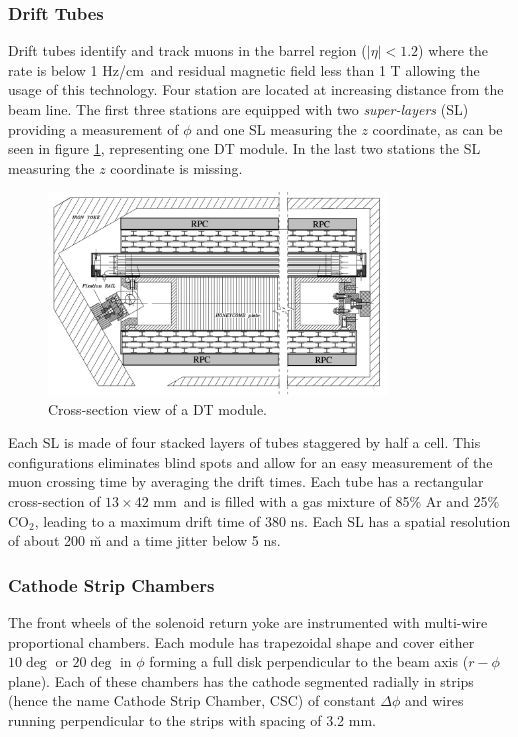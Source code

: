 \subsubsection*{Drift Tubes}

Drift tubes identify and track muons in the barrel region ($|\eta| < 1.2$) where the rate is below 1 Hz/cm\sq ~and residual magnetic field less than 1 T allowing the usage of this technology. Four station are located at increasing distance from the beam line. The first three stations are equipped with two \emph{super-layers} (SL) providing a measurement of $\phi$ and one SL measuring the $z$ coordinate, as can be seen in figure \ref{fig:dt_module}, representing one DT module. In the last two stations the SL measuring the $z$ coordinate is missing. 

\begin{figure}
\begin{center}
\includegraphics[angle=-0,width=0.8\textwidth]{2_LHC_and_CMS/pics/cms_dt.png}
\caption{Cross-section view of a DT module.
\label{fig:dt_module}
}
\end{center}
\end{figure}


Each SL is made of four stacked layers of tubes staggered by half a cell. This configurations eliminates blind spots and allow for an easy measurement of the muon crossing time by averaging the drift times. Each tube has a rectangular cross-section of $13\times42$ mm\sq ~and is filled with a gas mixture of 85\% Ar and 25\% CO$_2$, leading to a maximum drift time of 380 ns. Each SL has a spatial resolution of about 200 \u m and a time jitter below 5 ns.

\subsubsection*{Cathode Strip Chambers}

The front wheels of the solenoid return yoke are instrumented with multi-wire proportional chambers. Each module has trapezoidal shape and cover either $10\deg$ or $20\deg$ in $\phi$ forming a full disk perpendicular to the beam axis ($r-\phi$ plane). Each of these chambers has the cathode segmented radially in strips (hence the name Cathode Strip Chamber, CSC) of constant $\Delta\phi$ and wires running perpendicular to the strips with spacing of 3.2 mm. 

